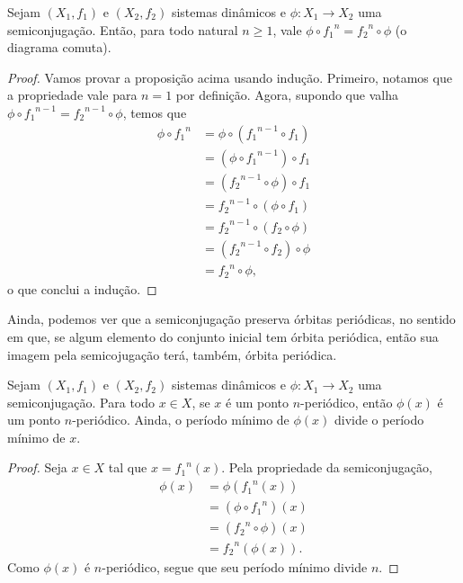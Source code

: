 \begin{proposition}
Sejam $(X_1,f_1)$ e $(X_2,f_2)$ sistemas dinâmicos e $\phi: X_1 \to X_2$ uma semiconjugação. Então, para todo natural $n \geq 1$, vale $\phi \circ {f_1}^n = {f_2}^n \circ \phi$ (o diagrama comuta).

\begin{figure}
\centering
{}
\end{figure}
\end{proposition}
\begin{proof}
Vamos provar a proposição acima usando indução. Primeiro, notamos que a propriedade vale para $n = 1$ por definição. Agora, supondo que valha $\phi \circ {f_1}^{n-1} = {f_2}^{n-1} \circ \phi$, temos que
	\begin{align*}
	\phi \circ {f_1}^n & = \phi \circ ({f_1}^{n-1} \circ {f_1}) \\
						& = (\phi \circ {f_1}^{n-1}) \circ {f_1} \\
						& = ({f_2}^{n-1} \circ \phi) \circ {f_1} \\
						& = {f_2}^{n-1} \circ (\phi \circ {f_1}) \\
						& = {f_2}^{n-1} \circ ({f_2} \circ \phi) \\
						& = ({f_2}^{n-1} \circ {f_2}) \circ \phi \\
						& = {f_2}^n \circ \phi,
	\end{align*}
o que conclui a indução.
	\end{proof}

Ainda, podemos ver que a semiconjugação preserva órbitas periódicas, no sentido em que, se algum elemento do conjunto inicial tem órbita periódica, então sua imagem pela semicojugação terá, também, órbita periódica.

\begin{proposition}
Sejam $(X_1,f_1)$ e $(X_2,f_2)$ sistemas dinâmicos e $\phi: X_1 \to X_2$ uma semiconjugação. Para todo $x \in X$, se $x$ é um ponto $n$-periódico, então $\phi(x)$ é um ponto $n$-periódico. Ainda, o período mínimo de $\phi(x)$ divide o período mínimo de $x$.
\end{proposition}
\begin{proof} Seja $x \in X$ tal que $x = {f_1}^n(x)$. Pela propriedade da semiconjugação,
	\begin{align*}
	\phi(x) & = \phi({f_1}^n(x)) \\
      		  	 & = (\phi \circ {f_1}^n)(x) \\
      		  	 & = ({f_2}^n \circ \phi)(x) \\
      		  	 & = {f_2}^n(\phi(x)).
	\end{align*}
Como $\phi(x)$ é $n$-periódico, segue que seu período mínimo divide $n$.
\end{proof}


